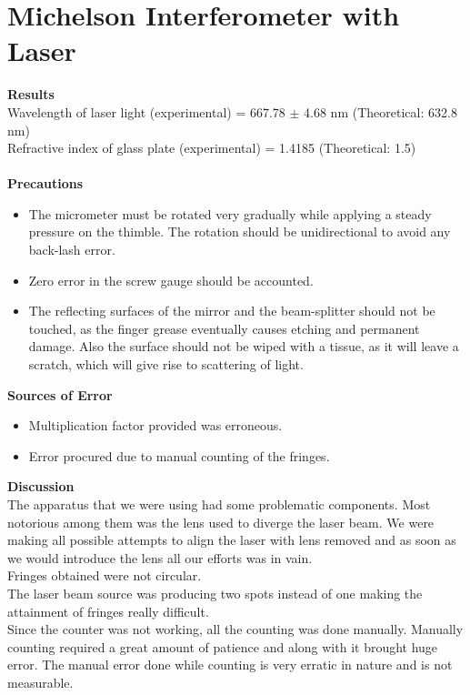 \documentclass[12pt]{report}
\begin{document}
	\section{Michelson Interferometer with Laser}
	\textbf{Results}\\
	Wavelength of laser light (experimental) = 667.78 $\pm$ 4.68 nm (Theoretical: 632.8 nm)\\
	Refractive index of glass plate (experimental) = 1.4185 (Theoretical: 1.5)\\ \\
	\textbf{Precautions}
	\begin{itemize}
		\item The micrometer must be rotated very gradually while applying a steady pressure
		on the thimble. The rotation should be unidirectional to avoid any back-lash error.
		\item Zero error in the screw gauge should be accounted.
		\item The reflecting surfaces of the mirror and the beam-splitter should not be touched,
		as the finger grease eventually causes etching and permanent damage. Also the
		surface should not be wiped with a tissue, as it will leave a scratch, which will
		give rise to scattering of light.
	\end{itemize}
	\textbf{Sources of Error}
	\begin{itemize}
		\item Multiplication factor provided was erroneous. 
		\item Error procured due to manual counting of the fringes. 
	\end{itemize}
	\textbf{Discussion}\\
	The apparatus that we were using had some problematic components. Most notorious among them was the lens used to diverge the laser beam. We were making all possible attempts to align the laser with lens removed and as soon as we would introduce the lens all our efforts was in vain.\\
	Fringes obtained were not circular.\\
	The laser beam source was producing two spots instead of one making the attainment of fringes really difficult.\\
	Since the counter was not working, all the counting was done manually. Manually counting required a great amount of patience and along with it brought huge error. The manual error done while counting is very erratic in nature and is not measurable.
	\newpage
\end{document}

